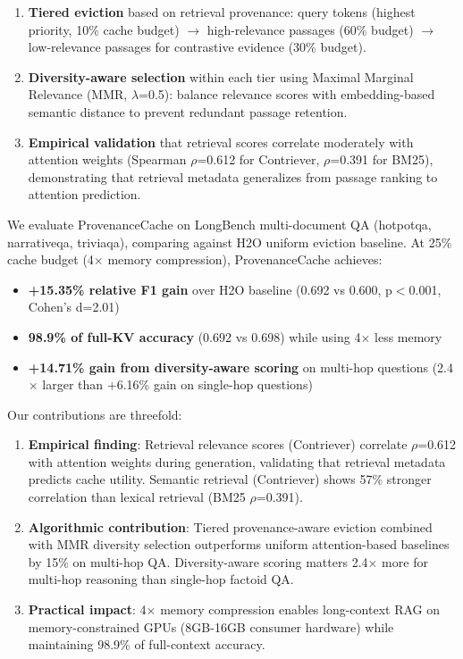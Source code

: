 \begin{enumerate}
\item \textbf{Tiered eviction} based on retrieval provenance: query tokens (highest priority, 10\% cache budget) $\rightarrow$ high-relevance passages (60\% budget) $\rightarrow$ low-relevance passages for contrastive evidence (30\% budget).
\item \textbf{Diversity-aware selection} within each tier using Maximal Marginal Relevance (MMR, $\lambda$=0.5): balance relevance scores with embedding-based semantic distance to prevent redundant passage retention.
\item \textbf{Empirical validation} that retrieval scores correlate moderately with attention weights (Spearman $\rho$=0.612 for Contriever, $\rho$=0.391 for BM25), demonstrating that retrieval metadata generalizes from passage ranking to attention prediction.
\end{enumerate}

We evaluate ProvenanceCache on LongBench multi-document QA (hotpotqa, narrativeqa, triviaqa), comparing against H2O uniform eviction baseline. At 25\% cache budget (4$\times$ memory compression), ProvenanceCache achieves:

\begin{itemize}
\item \textbf{+15.35\% relative F1 gain} over H2O baseline (0.692 vs 0.600, p$<$0.001, Cohen's d=2.01)
\item \textbf{98.9\% of full-KV accuracy} (0.692 vs 0.698) while using 4$\times$ less memory
\item \textbf{+14.71\% gain from diversity-aware scoring} on multi-hop questions (2.4$\times$ larger than +6.16\% gain on single-hop questions)
\end{itemize}

Our contributions are threefold:

\begin{enumerate}
\item \textbf{Empirical finding}: Retrieval relevance scores (Contriever) correlate $\rho$=0.612 with attention weights during generation, validating that retrieval metadata predicts cache utility. Semantic retrieval (Contriever) shows 57\% stronger correlation than lexical retrieval (BM25 $\rho$=0.391).
\item \textbf{Algorithmic contribution}: Tiered provenance-aware eviction combined with MMR diversity selection outperforms uniform attention-based baselines by 15\% on multi-hop QA. Diversity-aware scoring matters 2.4$\times$ more for multi-hop reasoning than single-hop factoid QA.
\item \textbf{Practical impact}: 4$\times$ memory compression enables long-context RAG on memory-constrained GPUs (8GB-16GB consumer hardware) while maintaining 98.9\% of full-context accuracy.
\end{enumerate}

